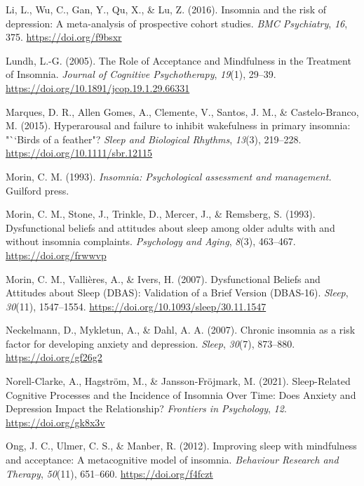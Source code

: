 \documentclass[
  ,doc,11pt, twoside,floatsintext]{apa6}
\newlength{\cslhangindent}
\newlength{\cslentryspacingunit} %
\newenvironment{CSLReferences}[2] %
 {%
  \setlength{\parindent}{0pt}
  \ifodd #1
  \let\oldpar\par
  \def\par{\hangindent=\cslhangindent\oldpar}
  \fi
  \setlength{\parskip}{#2\cslentryspacingunit}
 }%
 {}
\begin{document}
\begin{CSLReferences}{1}{0}
\leavevmode{}%
Li, L., Wu, C., Gan, Y., Qu, X., \& Lu, Z. (2016). Insomnia and the risk of depression: A meta-analysis of prospective cohort studies. \emph{BMC Psychiatry}, \emph{16}, 375. \url{https://doi.org/f9bsxr}

\leavevmode{}%
Lundh, L.-G. (2005). The {Role} of {Acceptance} and {Mindfulness} in the {Treatment} of {Insomnia}. \emph{Journal of Cognitive Psychotherapy}, \emph{19}(1), 29--39. \url{https://doi.org/10.1891/jcop.19.1.29.66331}

\leavevmode{}%
Marques, D. R., Allen Gomes, A., Clemente, V., Santos, J. M., \& Castelo-Branco, M. (2015). Hyperarousal and failure to inhibit wakefulness in primary insomnia: "``Birds of a feather"? \emph{Sleep and Biological Rhythms}, \emph{13}(3), 219--228. \url{https://doi.org/10.1111/sbr.12115}

\leavevmode{}%
Morin, C. M. (1993). \emph{Insomnia: Psychological assessment and management.} Guilford press.

\leavevmode{}%
Morin, C. M., Stone, J., Trinkle, D., Mercer, J., \& Remsberg, S. (1993). Dysfunctional beliefs and attitudes about sleep among older adults with and without insomnia complaints. \emph{Psychology and Aging}, \emph{8}(3), 463--467. \url{https://doi.org/frwwvp}

\leavevmode{}%
Morin, C. M., Vallières, A., \& Ivers, H. (2007). Dysfunctional {Beliefs} and {Attitudes} about {Sleep} ({DBAS}): {Validation} of a {Brief Version} ({DBAS-16}). \emph{Sleep}, \emph{30}(11), 1547--1554. \url{https://doi.org/10.1093/sleep/30.11.1547}

\leavevmode{}%
Neckelmann, D., Mykletun, A., \& Dahl, A. A. (2007). Chronic insomnia as a risk factor for developing anxiety and depression. \emph{Sleep}, \emph{30}(7), 873--880. \url{https://doi.org/gf26g2}

\leavevmode{}%
Norell-Clarke, A., Hagström, M., \& Jansson-Fröjmark, M. (2021). Sleep-{Related Cognitive Processes} and the {Incidence} of {Insomnia Over Time}: {Does Anxiety} and {Depression Impact} the {Relationship}? \emph{Frontiers in Psychology}, \emph{12}. \url{https://doi.org/gk8x3v}

\leavevmode{}%
Ong, J. C., Ulmer, C. S., \& Manber, R. (2012). Improving sleep with mindfulness and acceptance: {A} metacognitive model of insomnia. \emph{Behaviour Research and Therapy}, \emph{50}(11), 651--660. \url{https://doi.org/f4fczt}


\end{CSLReferences}
\end{document}
